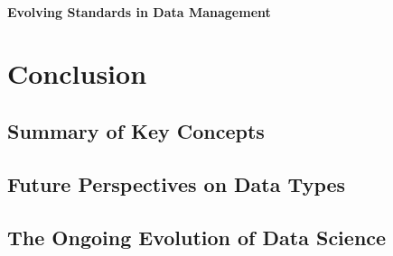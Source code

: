 \documentclass[12pt, oneside]{book}
\begin{document}
\subsubsection{Evolving Standards in Data Management}

\chapter{Conclusion}
\section{Summary of Key Concepts}
\section{Future Perspectives on Data Types}
\section{The Ongoing Evolution of Data Science}
\end{document}
